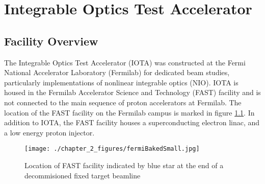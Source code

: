 \chapter{Integrable Optics Test Accelerator} \label{chap:iota}

\section{Facility Overview}

The Integrable Optics Test Accelerator (IOTA) was constructed at the Fermi National Accelerator Laboratory (Fermilab) for dedicated beam studies, particularly implementations of nonlinear integrable optics (NIO). IOTA is housed in the Fermilab Accelerator Science and Technology (FAST) facility and is not connected to the main sequence of proton accelerators at Fermilab. The location of the FAST facility on the Fermilab campus is marked in figure \ref{fig:FastMap}. In addition to IOTA, the FAST facility houses a superconducting electron linac, and a low energy proton injector.

\begin{figure}
	\centering
	\texttt{[image: ./chapter\_2\_figures/fermiBakedSmall.jpg]}
	\caption{Location of FAST facility indicated by blue star at the end of a decommisioned fixed target beamline}
	\label{fig:FastMap}
\end{figure}


